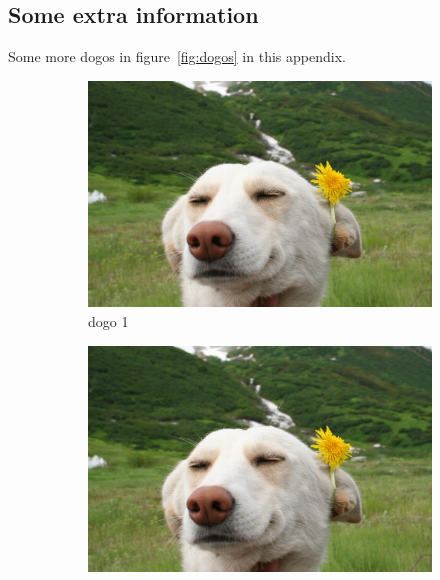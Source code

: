 \documentclass[12pt, a4paper, oneside]{article}
\begin{document}


\subsection{Some extra information} \label{appendix:extra}

Some more dogos in figure~\ref{fig:dogos} in this appendix. \medskip

\begin{figure}[h] %
    \centering
    \begin{subfigure}[b]{0.4\textwidth}
        \includegraphics[trim={0.9cm 0cm 0.9cm 0.73cm}, clip, width=\textwidth]{dog}
        \caption{dogo 1} \vspace{5mm}
    \end{subfigure}
    \hspace{6mm}
    \begin{subfigure}[b]{0.4\textwidth}
        \includegraphics[trim={0.9cm 0cm 0.9cm 0.73cm}, clip, width=\textwidth]{dog}

\end{subfigure}
\end{figure}
\end{document}
